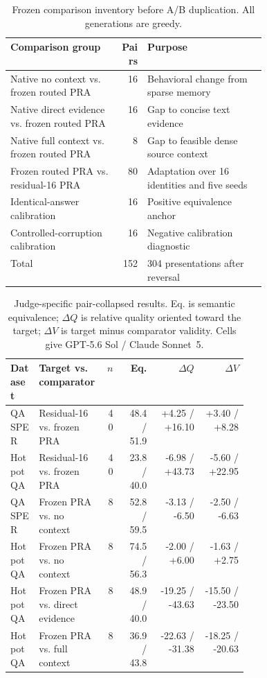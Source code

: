 \documentclass[11pt]{article}
\begin{document}
\begin{table}[H]
\centering
\small
\caption{Frozen comparison inventory before A/B duplication. All generations are greedy.}
\label{tab:behavioral-judge-package}
\begin{tabularx}{\linewidth}{L{0.43\linewidth}rY}
\toprule
Comparison group & Pairs & Purpose \\
\midrule
Native no context vs. frozen routed PRA & 16 & Behavioral change from sparse memory \\
Native direct evidence vs. frozen routed PRA & 16 & Gap to concise text evidence \\
Native full context vs. frozen routed PRA & 8 & Gap to feasible dense source context \\
Frozen routed PRA vs. residual-16 PRA & 80 & Adaptation over 16 identities and five seeds \\
Identical-answer calibration & 16 & Positive equivalence anchor \\
Controlled-corruption calibration & 16 & Negative calibration diagnostic \\
\midrule
Total & 152 & 304 presentations after reversal \\
\bottomrule
\end{tabularx}
\end{table}

\begin{table}[H]
\centering
\scriptsize
\caption{Judge-specific pair-collapsed results. Eq. is semantic equivalence; $\Delta Q$ is
relative quality oriented toward the target; $\Delta V$ is target minus comparator validity.
Cells give GPT-5.6 Sol / Claude Sonnet~5.}
\label{tab:behavioral-judge-results}
\begin{tabular}{L{0.12\linewidth}L{0.28\linewidth}rrrr}
\toprule
Dataset & Target vs. comparator & $n$ & Eq. & $\Delta Q$ & $\Delta V$ \\
\midrule
QASPER & Residual-16 vs. frozen PRA & 40 & 48.4 / 51.9 & +4.25 / +16.10 & +3.40 / +8.28 \\
HotpotQA & Residual-16 vs. frozen PRA & 40 & 23.8 / 40.0 & -6.98 / +43.73 & -5.60 / +22.95 \\
QASPER & Frozen PRA vs. no context & 8 & 52.8 / 59.5 & -3.13 / -6.50 & -2.50 / -6.63 \\
HotpotQA & Frozen PRA vs. no context & 8 & 74.5 / 56.3 & -2.00 / +6.00 & -1.63 / +2.75 \\
HotpotQA & Frozen PRA vs. direct evidence & 8 & 48.9 / 40.0 & -19.25 / -43.63 & -15.50 / -23.50 \\
HotpotQA & Frozen PRA vs. full context & 8 & 36.9 / 43.8 & -22.63 / -31.38 & -18.25 / -20.63 \\
\bottomrule
\end{tabular}
\end{table}
\end{document}
